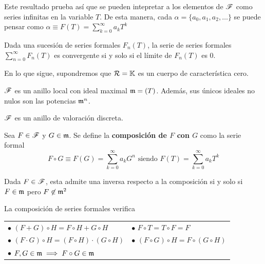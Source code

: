 Este resultado prueba así que se pueden intepretar a los elementos de $\mathscr{F}$ como series infinitas en la variable $T$. De esta manera, cada $\alpha = \{ a_0, a_1, a_2,\dots\}$ se puede pensar como $\alpha \equiv F(T) = \sum_{k=0}^\infty a_k T^k$

\begin{teorema}
    Dada una sucesión de series formales $F_n(T)$, la serie de series formales $\sum_{n=0}^\infty F_n(T)$ es convergente si y solo si el límite de $F_n(T)$ es 0.
\end{teorema}

En lo que sigue, supondremos que $\mathcal{R} = \mathbb{K}$ es un cuerpo de característica cero.

\begin{teorema}
    $\mathscr{F}$ es un anillo local con ideal maximal $\mathfrak{m} = (T)$. Además, sus únicos ideales no nulos son las potencias $\mathfrak{m}^n$.
\end{teorema}

\begin{corolario}
    $\mathscr{F}$ es un anillo de valoración discreta.
\end{corolario}

\begin{definicion}
    Sea $F \in \mathscr{F}$ y $G \in \mathfrak{m}$. Se define la \textbf{composición de $F$ con $G$} como la serie formal
    \begin{equation*}
        F \circ G \equiv F(G) = \sum_{k=0}^\infty a_k G^n \text{ siendo } F(T) = \sum_{k=0}^\infty a_k T^k
    \end{equation*}
\end{definicion}

\begin{teorema}
    Dada $F \in \mathscr{F}$, esta admite una inversa respecto a la composición si y solo si $F \in \mathfrak{m}$ pero $F \not \in \mathfrak{m}^2$
\end{teorema}

\begin{proposicion}
    La composición de series formales verifica

    \begin{tabular}{@{}ll@{}}
    $\bullet$ $(F + G) \circ H = F \circ H + G \circ H$ & 
    \quad $\bullet$ $F \circ T = T \circ F = F$ \\[6pt]
    $\bullet$ $(F \cdot G) \circ H = (F \circ H) \cdot (G \circ H)$ & 
    \quad $\bullet$ $(F \circ G) \circ H = F \circ (G \circ H)$ \\[6pt]
    $\bullet$ $F, G \in \mathfrak{m} \implies F \circ G \in \mathfrak{m}$ & \\
    \end{tabular}
\end{proposicion}

